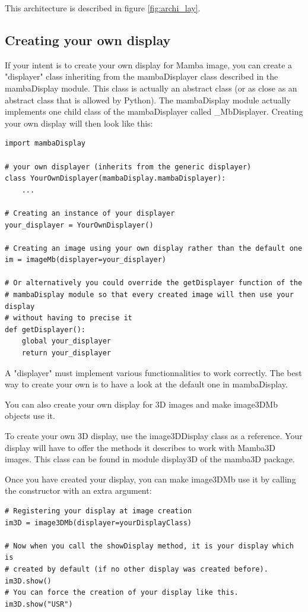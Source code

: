 \documentclass[a4paper,10pt,oneside]{article}
\begin{document}
This architecture is described in figure \ref{fig:archi_lay}.

\subsection{Creating your own display}
\label{cha:create_own_disp}

If your intent is to create your own display for Mamba image, you can create
a "displayer" class inheriting from the mambaDisplayer class described in the
mambaDisplay module. This class is actually an abstract class (or as close
as an abstract class that is allowed by Python). The mambaDisplay module
actually implements one child class of the mambaDisplayer called \_MbDisplayer.
Creating your own display will then look like this:

\lstset{language=Python}
\begin{lstlisting}
import mambaDisplay

# your own displayer (inherits from the generic displayer)
class YourOwnDisplayer(mambaDisplay.mambaDisplayer):
    ...
    
# Creating an instance of your displayer
your_displayer = YourOwnDisplayer()

# Creating an image using your own display rather than the default one
im = imageMb(displayer=your_displayer)

# Or alternatively you could override the getDisplayer function of the 
# mambaDisplay module so that every created image will then use your display
# without having to precise it
def getDisplayer():
    global your_displayer
    return your_displayer
\end{lstlisting}

A "displayer" must implement various functionnalities to work correctly. The 
best way to create your own is to have a look at the default one in mambaDisplay.

You can also create your own display for 3D images and make image3DMb objects
use it.

To create your own 3D display, use the image3DDisplay class as a reference. Your
display will have to offer the methods it describes to work with Mamba3D
images. This class can be found in module display3D of the mamba3D package.

Once you have created your display, you can make image3DMb use it by calling the
constructor with an extra argument:

\lstset{language=Python}
\begin{lstlisting}
# Registering your display at image creation
im3D = image3DMb(displayer=yourDisplayClass)

# Now when you call the showDisplay method, it is your display which is 
# created by default (if no other display was created before).
im3D.show()
# You can force the creation of your display like this.
im3D.show("USR")
\end{lstlisting}
\end{document}
